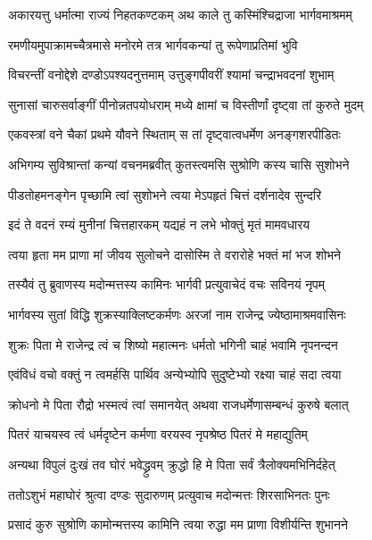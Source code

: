 \twolineshloka
{अकारयत्तु धर्मात्मा राज्यं निहतकण्टकम्}
{अथ काले तु कस्मिंश्चिद्राजा भार्गवमाश्रमम्}%

\twolineshloka
{रमणीयमुपाक्रामच्चैत्रमासे मनोरमे}
{तत्र भार्गवकन्यां तु रूपेणाप्रतिमां भुवि}%

\twolineshloka
{विचरन्तीं वनोद्देशे दण्डोऽपश्यदनुत्तमाम्}
{उत्तुङ्गपीवरीं श्यामां चन्द्राभवदनां शुभाम्}%

\twolineshloka
{सुनासां चारुसर्वाङ्गीं पीनोन्नतपयोधराम्}
{मध्ये क्षामां च विस्तीर्णां दृष्ट्वा तां कुरुते मुदम्}%

\twolineshloka
{एकवस्त्रां वने चैकां प्रथमे यौवने स्थिताम्}
{स तां दृष्ट्वात्वधर्मेण अनङ्गशरपीडितः}%

\twolineshloka
{अभिगम्य सुविश्रान्तां कन्यां वचनमब्रवीत्}
{कुतस्त्वमसि सुश्रोणि कस्य चासि सुशोभने}%

\twolineshloka
{पीडतोहमनङ्गेन पृच्छामि त्वां सुशोभने}
{त्वया मेऽपहृतं चित्तं दर्शनादेव सुन्दरि}%

\twolineshloka
{इदं ते वदनं रम्यं मुनीनां चित्तहारकम्}
{यद्यहं न लभे भोक्तुं मृतं मामवधारय}%

\twolineshloka
{त्वया हृता मम प्राणा मां जीवय सुलोचने}
{दासोस्मि ते वरारोहे भक्तं मां भज शोभने}%

\twolineshloka
{तस्यैवं तु ब्रुवाणस्य मदोन्मत्तस्य कामिनः}
{भार्गवी प्रत्युवाचेदं वचः सविनयं नृपम्}%

\twolineshloka
{भार्गवस्य सुतां विद्धि शुक्रस्याक्लिष्टकर्मणः}
{अरजां नाम राजेन्द्र ज्येष्ठामाश्रमवासिनः}%

\twolineshloka
{शुक्रः पिता मे राजेन्द्र त्वं च शिष्यो महात्मनः}
{धर्मतो भगिनी चाहं भवामि नृपनन्दन}%

\twolineshloka
{एवंविधं वचो वक्तुं न त्वमर्हसि पार्थिव}
{अन्येभ्योपि सुदुष्टेभ्यो रक्ष्या चाहं सदा त्वया}%

\twolineshloka
{क्रोधनो मे पिता रौद्रो भस्मत्वं त्वां समानयेत्}
{अथवा राजधर्मेणासम्बन्धं कुरुषे बलात्}%

\twolineshloka
{पितरं याचयस्व त्वं धर्मदृष्टेन कर्मणा}
{वरयस्व नृपश्रेष्ठ पितरं मे महाद्युतिम्}%

\twolineshloka
{अन्यथा विपुलं दुःखं तव घोरं भवेद्ध्रुवम्}
{क्रुद्धो हि मे पिता सर्वं त्रैलोक्यमभिनिर्दहेत्}%

\twolineshloka
{ततोऽशुभं महाघोरं श्रुत्वा दण्डः सुदारुणम्}
{प्रत्युवाच मदोन्मत्तः शिरसाभिनतः पुनः}%

\twolineshloka
{प्रसादं कुरु सुश्रोणि कामोन्मत्तस्य कामिनि}
{त्वया रुद्धा मम प्राणा विशीर्यन्ति शुभानने}%

